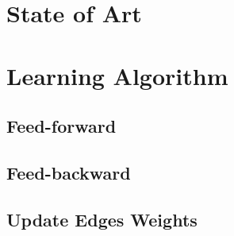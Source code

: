 \documentclass[10pt,a4paper]{article}
\author{Diogo Pinto, Luís Brochado, Wilson Oliveira}
\begin{document}
\maketitle

\makeindex

\section{State of Art}

\section{Learning Algorithm}

\subsection{Feed-forward}

\subsection{Feed-backward}

\subsection{Update Edges Weights}
\end{document}
